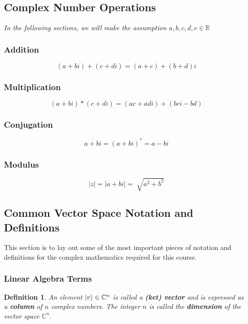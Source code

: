 \documentclass[12pt]{article}
\theoremstyle{plain}
\theoremstyle{nonumberplain}
\theoremstyle{plain}
\newtheorem{definition}[lemma]{Definition}
\theoremstyle{nonumberplain}
\newcommand\1{{\bf 1}}
\newcommand{\R}{\mathbb{R}} %
\newcommand{\C}{\mathbb{C}} %
\newcommand{\<}{\left\langle}
\renewcommand{\>}{\right\rangle}
\begin{document}
\subsection{Complex Number Operations}
\textit{In the following sections, we will make the assumption $a, b, c, d, e \in \R$}
	\subsubsection{Addition}	
\begin{equation}
(a + bi) + (c + di) = (a+c) + (b+d)i 
\end{equation}

\subsubsection{Multiplication}	
\begin{equation}
(a+bi) * (c + di) = (ac+adi) + (bci-bd)
\end{equation}

\subsubsection{Conjugation}	
\begin{equation}
\overline{a + bi} = (a + bi)^* = a - bi
\end{equation}

\subsubsection{Modulus}	
\begin{equation}
|z| = |a + bi| = \sqrt[]{a^2 + b^2} 
\end{equation}
		
	
		
\subsection{Common Vector Space Notation and Definitions}
This section is to lay out some of the most important pieces of notation and definitions for the complex mathematics required for this course.  
\subsubsection{Linear Algebra Terms}
\begin{definition}
An element $\ket{v}\in \C^n$ is called a \textbf{(ket) vector} and is expressed as a \textbf{column} of $n$ complex numbers. The integer $n$ is called the \textbf{dimension} of the vector space $\C^n.$
\end{definition}
\end{document}

